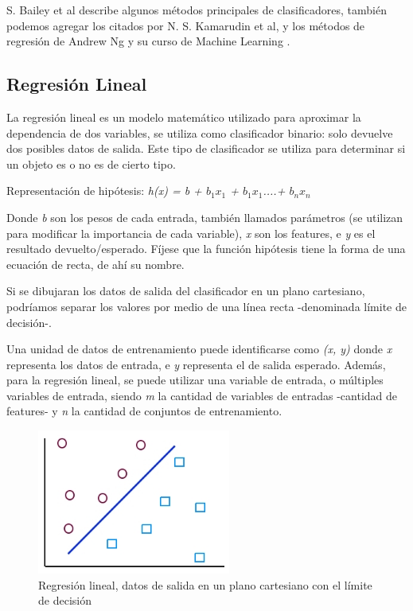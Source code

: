 \documentclass[a4paper,12pt,oneside,spanish]{book}
\begin{document}
S. Bailey et al \cite{bailey} describe algunos métodos principales de clasificadores, también podemos agregar los citados por N. S. Kamarudin et al\cite{kamarudin}, y los métodos de regresión de Andrew Ng y su curso de Machine Learning  \cite{machinelearningcoursera}. \par

\subsection{Regresión Lineal}

La regresión lineal es un modelo matemático utilizado para aproximar la dependencia de dos variables, se utiliza como clasificador binario: solo devuelve dos posibles datos de salida. Este tipo de clasificador se utiliza para determinar si un objeto es o no es de cierto tipo. \par
Representación de hipótesis: \textit{h(x) = b + $b_1$$x_1$ + $b_1$$x_1$....+ $b_n$$x_n$}
	
Donde \textit{b} son los pesos de cada entrada, también llamados parámetros (se utilizan para modificar la importancia de cada variable), \textit{x} son los features, e \textit{y} es el resultado devuelto/esperado. Fíjese que la función hipótesis tiene la forma de una ecuación de recta, de ahí su nombre. \par


Si se dibujaran los datos de salida del clasificador en un plano cartesiano, podríamos separar los valores por medio de una línea recta -denominada límite de decisión-. \par

Una unidad de datos de entrenamiento puede identificarse como \textit{(x, y)} donde \textit{x} representa los datos de entrada, e \textit{y} representa el de salida esperado. Además, para la regresión lineal, se puede utilizar una variable de entrada, o múltiples variables de entrada, siendo \textit{m} la cantidad de variables de entradas -cantidad de features- y \textit{n} la cantidad de conjuntos de entrenamiento.  \par

\begin{figure}[h!]
	\includegraphics[width=180pt]{Imagenes/regresion1.jpg}
	\centering
	\caption{Regresión lineal, datos de salida en un plano cartesiano con el límite de decisión}
	\label{fig:regresion1}
\end{figure}
\end{document}

